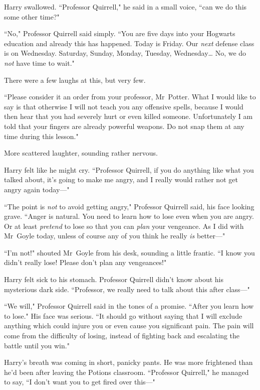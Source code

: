 Harry swallowed. ``Professor Quirrell," he said in a small voice, ``can we do this some other time?"

``No," Professor Quirrell said simply. ``You are five days into your Hogwarts education and already this has happened. Today is Friday. Our \emph{next} defense class is on Wednesday. Saturday, Sunday, Monday, Tuesday, Wednesday{\ldots} No, we do \emph{not} have time to wait."

There were a few laughs at this, but very few.

``Please consider it an order from your professor, Mr~Potter. What I would like to say is that otherwise I will not teach you any offensive spells, because I would then hear that you had severely hurt or even killed someone. Unfortunately I am told that your fingers are already powerful weapons. Do not snap them at any time during this lesson."

More scattered laughter, sounding rather nervous.

Harry felt like he might cry. ``Professor Quirrell, if you do anything like what you talked about, it's going to make me angry, and I really would rather not get angry again today—"

``The point is \emph{not} to avoid getting angry," Professor Quirrell said, his face looking grave. ``Anger is natural. You need to learn how to lose even when you are angry. Or at least \emph{pretend} to lose so that you can \emph{plan} your vengeance. As I did with Mr~Goyle today, unless of course any of you think he really \emph{is} better—"

``I'm not!" shouted Mr~Goyle from his desk, sounding a little frantic. ``I know you didn't really lose! Please don't plan any vengeances!"

Harry felt sick to his stomach. Professor Quirrell didn't know about his mysterious dark side. ``Professor, we really need to talk about this after class—"

``We will," Professor Quirrell said in the tones of a promise. ``After you learn how to lose." His face was serious. ``It should go without saying that I will exclude anything which could injure you or even cause you significant pain. The pain will come from the difficulty of losing, instead of fighting back and escalating the battle until you win."

Harry's breath was coming in short, panicky pants. He was more frightened than he'd been after leaving the Potions classroom. ``Professor Quirrell," he managed to say, ``I don't want you to get fired over this—"

